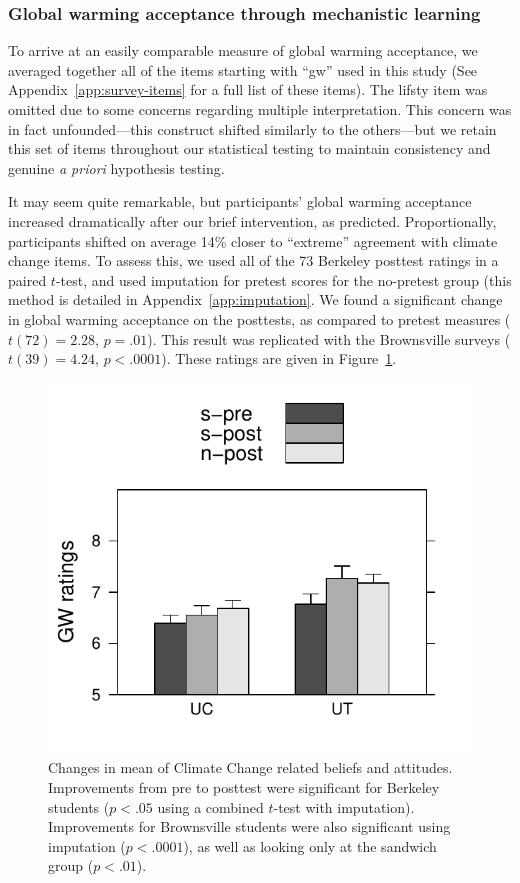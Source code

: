 \subsubsection{Global warming acceptance through mechanistic learning}

To arrive at an easily comparable measure of global warming acceptance, we
averaged together all of the items starting with “\textsf{gw}” used in this
study (See Appendix~\ref{app:survey-items} for a full list of these items).
The \textsf{lifsty} item was omitted due to some concerns regarding multiple
interpretation. This concern was in fact unfounded---this construct shifted
similarly to the others---but we retain this set of items throughout our
statistical testing to maintain consistency and genuine \emph{a priori}
hypothesis testing. 

It may seem quite remarkable, but participants’ global warming acceptance
increased dramatically after our brief intervention, as predicted.
Proportionally, participants shifted on average 14\% closer to ``extreme''
agreement with climate change items. To assess this, we used all of the 73
Berkeley posttest ratings in a paired $t$-test, and used imputation for pretest
scores for the no-pretest group (this method is detailed in
Appendix~\ref{app:imputation}. We found a significant change in global warming
acceptance on the posttests, as compared to pretest measures ($t(72) = 2.28$, $p
= .01$). This result was replicated with the Brownsville surveys ($t(39) =
4.24$, $p < .0001$). These ratings are given in
Figure~\ref{fig:class-gw-ratings}.

\begin{figure}
    \centering
    \includegraphics{class-gw-ratings.pdf}
    \caption{Changes in mean of Climate Change related beliefs and attitudes.
        Improvements from pre to posttest were significant for
        Berkeley students ($p < .05$ using a combined $t$-test with imputation).
        Improvements for Brownsville students were also significant using
        imputation ($p < .0001$), as well as looking only at the sandwich group
        ($p < .01$).}
    \label{fig:class-gw-ratings}
\end{figure}

